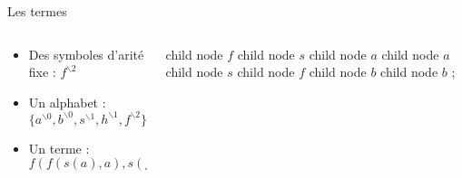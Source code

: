 \begin{frame}{Les termes}
  \begin{columns}
    \begin{column}{0.65\textwidth}
      \begin{block}{}
        \begin{itemize}[<+->]
        \item Des symboles d'arité fixe : $f^{\backslash 2}$
        \item Un alphabet : $\{ a^{\backslash 0}, b^{\backslash 0}, s^{\backslash 1}, h^{\backslash 1}, f^{\backslash 2}\}$
        \item Un terme : $f(f(s(a), a),s(f(b,b)))$
        \end{itemize}
      \end{block}
    \end{column}
    \begin{column}{0.35\textwidth}
      \begin{tikz}
          child { node {$f$}
            child { node {$s$}
              child { node {$a$} } }
            child { node {$a$} } }
          child { node {$s$}
            child {node {$f$}
              child { node {$b$} }
              child { node {$b$} } } };
      \end{tikz}
    \end{column}
  \end{columns}
\end{frame}

